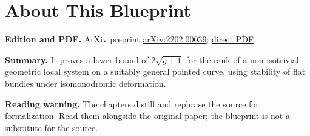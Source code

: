 

\chapter*{About This Blueprint}
\label{geometric-local-systems-general-curves-isomonodromy-about}


\textbf{Edition and PDF.} ArXiv preprint \href{https://arxiv.org/abs/2202.00039}{arXiv:2202.00039}; \href{https://arxiv.org/pdf/2202.00039}{direct PDF}.

\textbf{Summary.} It proves a lower bound of $2\sqrt{g+1}$ for the rank of a non-isotrivial geometric local system on a suitably general pointed curve, using stability of flat bundles under isomonodromic deformation.

\textbf{Reading warning.} The chapters distill and rephrase the source for formalization. Read them alongside the original paper; the blueprint is not a substitute for the source.












